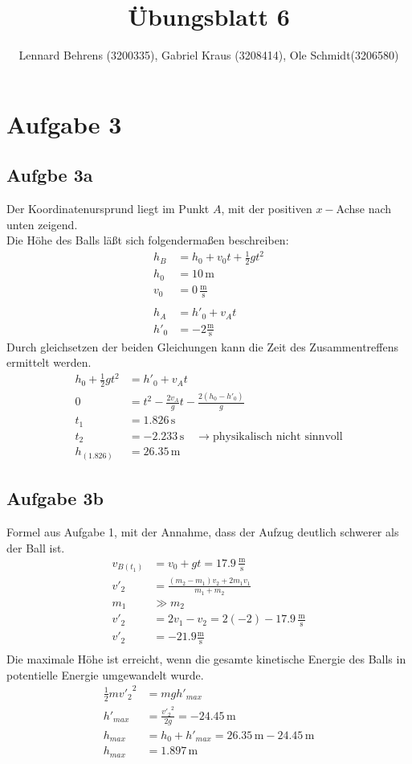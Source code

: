 \documentclass[a4paper,10pt]{extarticle}
\title{Übungsblatt 6}
\author{Lennard Behrens (3200335), Gabriel Kraus (3208414), Ole Schmidt(3206580)}
\begin{document}
\maketitle

\section*{Aufgabe 3}
  \subsection*{Aufgbe 3a}
  Der Koordinatenursprund liegt im Punkt $A$, mit der positiven $x-$Achse nach unten zeigend. \\ 
  Die Höhe des Balls läßt sich folgendermaßen beschreiben:
  \begin{align*}
  h_B &= h_0 + v_0 t + \frac{1}{2}gt^2 \\
  h_0 &= 10 \, \mbox{m} \\ 
  v_0 &= 0 \, \frac{\mbox{m}}{\mbox{s}} \\ \\
  h_A &= h'_0 + v_A t \\
  h'_0 &= -2 \frac{\mbox{m}}{\mbox{s}}
  \end{align*}
  Durch gleichsetzen der beiden Gleichungen kann die Zeit des Zusammentreffens ermittelt werden.
  \begin{align*}
  h_0 + \frac{1}{2}gt^2 &= h'_0 + v_A t \\
  0 &= t^2 - \frac{2 v_A}{g} t - \frac{2(h_0 - h'_0)}{g} \\
  t_1 &= 1.826 \, \mbox{s} \\
  t_2 &= -2.233 \, \mbox{s} \quad \rightarrow \mbox{physikalisch nicht sinnvoll}\\
  h_{(1.826)} &= 26.35\, \mbox{m}
  \end{align*}

  \subsection*{Aufgabe 3b}
  Formel aus Aufgabe 1, mit der Annahme, dass der Aufzug deutlich schwerer als der Ball ist.
  \begin{align*}
  v_{B(t_1)} &= v_0 + gt = 17.9 \, \frac{\mbox{m}}{\mbox{s}} \\
  v'_2 &= \frac{(m_2 - m_1)v_2 + 2 m_1 v_1}{m_1 + m_2} \\
  m_1 &\gg m_2 \\
  v'_2 &= 2v_1 - v_2 = 2(-2) - 17.9 \, \frac{\mbox{m}}{\mbox{s}} \\
  v'_2 &= -21.9 \frac{\mbox{m}}{\mbox{s}} \\
  \end{align*}
  Die maximale Höhe ist erreicht, wenn die gesamte kinetische Energie des Balls in potentielle Energie umgewandelt wurde.
  \begin{align*}
  \frac{1}{2} m {v'_2}^2 &= m g h'_{max} \\
  h'_{max} &= \frac{{v'_2}^2}{2g} = -24.45 \, \mbox{m} \\
  h_{max} &= h_0 + h'_{max} = 26.35 \, \mbox{m} - 24.45 \, \mbox{m} \\
  h_{max} &= 1.897 \, \mbox{m}
  \end{align*}
\end{document}
